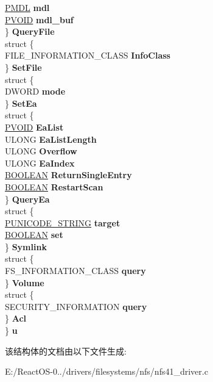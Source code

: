 \begin{DoxyCompactItemize}
\begin{tabbing}
\>\>\hyperlink{interfacevoid}{PMDL} {\bfseries mdl}\\
\>\>\hyperlink{interfacevoid}{PVOID} {\bfseries mdl\_buf}\\
\>\} {\bfseries QueryFile}\\
\>struct \{\\
\>\>FILE\_INFORMATION\_CLASS {\bfseries InfoClass}\\
\>\} {\bfseries SetFile}\\
\>struct \{\\
\>\>DWORD {\bfseries mode}\\
\>\} {\bfseries SetEa}\\
\>struct \{\\
\>\>\hyperlink{interfacevoid}{PVOID} {\bfseries EaList}\\
\>\>ULONG {\bfseries EaListLength}\\
\>\>ULONG {\bfseries Overflow}\\
\>\>ULONG {\bfseries EaIndex}\\
\>\>\hyperlink{_processor_bind_8h_a112e3146cb38b6ee95e64d85842e380a}{BOOLEAN} {\bfseries ReturnSingleEntry}\\
\>\>\hyperlink{_processor_bind_8h_a112e3146cb38b6ee95e64d85842e380a}{BOOLEAN} {\bfseries RestartScan}\\
\>\} {\bfseries QueryEa}\\
\>struct \{\\
\>\>\hyperlink{struct___u_n_i_c_o_d_e___s_t_r_i_n_g}{PUNICODE\_STRING} {\bfseries target}\\
\>\>\hyperlink{_processor_bind_8h_a112e3146cb38b6ee95e64d85842e380a}{BOOLEAN} {\bfseries set}\\
\>\} {\bfseries Symlink}\\
\>struct \{\\
\>\>FS\_INFORMATION\_CLASS {\bfseries query}\\
\>\} {\bfseries Volume}\\
\>struct \{\\
\>\>SECURITY\_INFORMATION {\bfseries query}\\
\>\} {\bfseries Acl}\\
\} {\bfseries u}\\

\end{tabbing}\end{DoxyCompactItemize}


该结构体的文档由以下文件生成\+:\begin{DoxyCompactItemize}
\item 
E\+:/\+React\+O\+S-\/0../drivers/filesystems/nfs/nfs41\+\_\+driver.\+c\end{DoxyCompactItemize}
